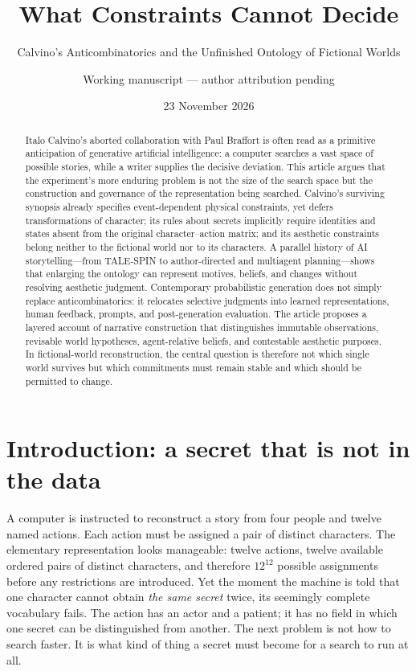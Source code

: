 \documentclass[
  11pt,
  letterpaper,
]{article}
\title{What Constraints Cannot Decide}
\subtitle{Calvino's Anticombinatorics and the Unfinished Ontology of
Fictional Worlds}
\author{Working manuscript --- author attribution pending}
\date{23 November 2026}
\begin{document}
\maketitle
\thispagestyle{fancy}
\begin{abstract}
Italo Calvino's aborted collaboration with Paul Braffort is often read
as a primitive anticipation of generative artificial intelligence: a
computer searches a vast space of possible stories, while a writer
supplies the decisive deviation. This article argues that the
experiment's more enduring problem is not the size of the search space
but the construction and governance of the representation being
searched. Calvino's surviving synopsis already specifies event-dependent
physical constraints, yet defers transformations of character; its rules
about secrets implicitly require identities and states absent from the
original character--action matrix; and its aesthetic constraints belong
neither to the fictional world nor to its characters. A parallel history
of AI storytelling---from TALE-SPIN to author-directed and multiagent
planning---shows that enlarging the ontology can represent motives,
beliefs, and changes without resolving aesthetic judgment. Contemporary
probabilistic generation does not simply replace anticombinatorics: it
relocates selective judgments into learned representations, human
feedback, prompts, and post-generation evaluation. The article proposes
a layered account of narrative construction that distinguishes immutable
observations, revisable world hypotheses, agent-relative beliefs, and
contestable aesthetic purposes. In fictional-world reconstruction, the
central question is therefore not which single world survives but which
commitments must remain stable and which should be permitted to change.
\end{abstract}

\section{Introduction: a secret that is not in the
data}\label{introduction-a-secret-that-is-not-in-the-data}

A computer is instructed to reconstruct a story from four people
and twelve named actions. Each action must be assigned a pair of distinct characters. The
elementary representation looks manageable: twelve actions, twelve
available ordered pairs of distinct characters, and therefore
\(12^{12}\) possible assignments before any restrictions are introduced.
Yet the moment the machine is told that one character cannot obtain
\emph{the same secret} twice, its seemingly complete vocabulary fails.
The action has an actor and a patient; it has no field in which one
secret can be distinguished from another. The next problem is not how to
search faster. It is what kind of thing a secret must become for a
search to run at all.
\end{document}
